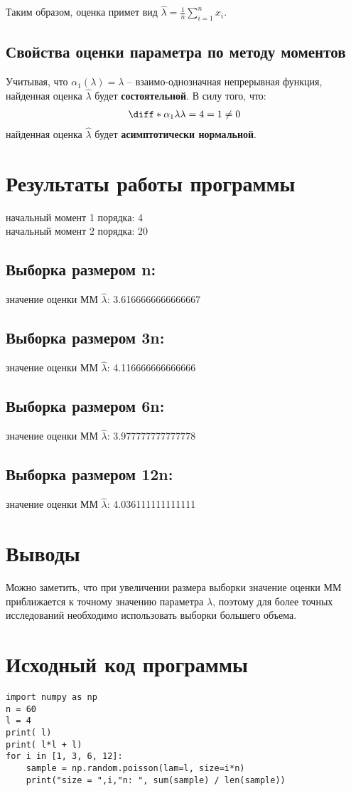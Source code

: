 \documentclass[12pt]{article}
\begin{document}
Таким образом, оценка примет вид $\hat{\lambda} = \frac1n \sum_{i=1}^n{x_i}$.

\subsection{Свойства оценки параметра по методу моментов}


Учитывая, что $\alpha_1(\lambda) = \lambda$ -- взаимо-однозначная непрерывная функция,  
найденная оценка $\hat{\lambda}$ будет \textbf{состоятельной}.
В силу того, что:
\begin{alignat*}{3}
      \diff*{\alpha_1}{\lambda}{\lambda = 4}  = 1 \ne 0
 \end{alignat*}
найденная оценка  $\hat{\lambda}$ будет \textbf{асимптотически нормальной}.
\section{Результаты работы программы}

начальный момент 1 порядка:  4 \\
начальный момент 2 порядка:  20


\subsection{Выборка размером n:}
значение оценки ММ $\hat{\lambda}$:  3.6166666666666667 \\

\subsection{Выборка размером 3n:}
значение оценки ММ $\hat{\lambda}$:  4.116666666666666 \\

\subsection{Выборка размером 6n:}
значение оценки ММ $\hat{\lambda}$:  3.977777777777778 \\

\subsection{Выборка размером 12n:}
значение оценки ММ $\hat{\lambda}$:  4.036111111111111 \\

\section{Выводы}
Можно заметить, что при увеличении размера выборки значение оценки ММ приближается к точному
значению параметра $\lambda$, поэтому
для более точных исследований необходимо использовать выборки большего объема.
\section{Исходный код программы}

\begin{lstlisting}
import numpy as np
n = 60
l = 4
print( l)
print( l*l + l)
for i in [1, 3, 6, 12]:  
    sample = np.random.poisson(lam=l, size=i*n)
    print("size = ",i,"n: ", sum(sample) / len(sample))
\end{lstlisting}
\end{document}
